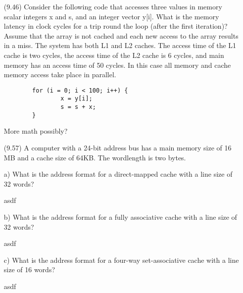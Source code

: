 \documentclass[letterpaper,10pt,titlepage]{article}
\begin{document}
\begin{enumerate}
	\item[(9.46)] Consider the following code that accesses three values in memory
		scalar integers x and s, and an integer vector y[i]. What is the memory
		latency in clock cycles for a trip round the loop (after the first
		iteration)? Assume that the array is not cached and each new access to the
		array results in a miss. The system has both L1 and L2 caches. The access
		time of the L1 cache is two cycles, the access time of the L2 cache is 6
		cycles, and main memory has an access time of 50 cycles. In this case all
		memory and cache memory access take place in parallel.
		\begin{verbatim}
		for (i = 0; i < 100; i++) {
		        x = y[i];
		        s = s + x;
		}
		\end{verbatim}
	\item[\textbullet] More math possibly?

	\item[(9.57)] A computer with a 24-bit address bus has a main memory size of 16 MB
		and a cache size of 64KB. The wordlength is two bytes.
	\item[a)] What is the address format for a direct-mapped cache with a line size of
		32 words?
	\item[\textbullet] asdf
	\item[b)] What is the address format for a fully associative cache with a line
		size of 32 words?
	\item[\textbullet] asdf
	\item[c)] What is the address format for a four-way set-associative cache with a
		line size of 16 words?
	\item[\textbullet] asdf


\end{enumerate}
\end{document}
